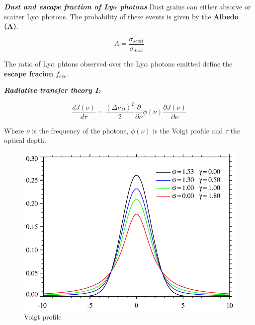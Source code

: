 \documentclass{beamer}
\begin{document}
\begin{frame}{\textit{\textbf{Dust and escape fraction of Ly$\alpha$ photons}}}
Dust grains can either absorve or scatter Ly$\alpha$ photons. The probability
of these events is given by the \textbf{Albedo (A)}.

\[   
A = \dfrac{\sigma_{scatt}}{\sigma_{dust}}
\]

The ratio of Ly$\alpha$ phtons observed over the Ly$\alpha$ photons emitted
define the \textbf{escape fracion $f_{esc}$}.
 
\end{frame}

\begin{frame}{\textit{\textbf{Radiative transfer theory I:}}}

\begin{equation}\label{eq:analytic}
\dfrac{d J(\nu)}{d\tau} = \dfrac{(\Delta \nu_D)^2}{2}\dfrac{\partial}{\partial \nu}\phi (\nu) \dfrac{\partial J(\nu)}{\partial \nu}
\end{equation}

Where $\nu$ is the frequency of the photons, $\phi(\nu)$ is the Voigt profile and $\tau$
the optical depth.

\begin{figure}
\includegraphics[scale=0.2]{Figures/voigt.png}
\caption{Voigt profile}
\end{figure}

\end{frame}
\end{document}
